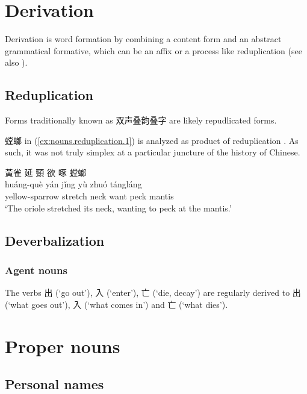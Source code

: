 \documentclass[UTF8, a4paper, oneside, scheme=plain, 12pt]{ctexrep}
\newcommand*{\citepage}[1]{p.~{#1}}
\newcommand{\translate}[1]{`#1'}
\begin{document}
\section{Derivation}

Derivation is word formation by combining a content form and an abstract grammatical formative,
which can be an affix or a process like reduplication (see also ).

\subsection{Reduplication}\label{sec:nouns.reduplication}

Forms traditionally known as 双声叠韵叠字 are likely repudlicated forms.

螳螂 in (\ref{ex:nouns.reduplication.1}) is analyzed as product of reduplication \citep[\citepage{93-95}]{sun2008reduplication}.
As such, it was not truly simplex at a particular juncture of the history of Chinese.

\begin{exe}
    \ex\label{ex:nouns.reduplication.1}
    \glll 黃雀 延 頸 欲 啄 螳螂 \\
    huáng-què yán jǐng yù zhuó tángláng \\
    yellow-sparrow stretch neck want peck mantis \\
    \glt\translate{The oriole stretched its neck, wanting to peck at the mantis.}
\end{exe}


\subsection{Deverbalization}

\subsubsection{Agent nouns}

The verbs 出 (\translate{go out}), 入 (\translate{enter}), 亡 (\translate{die, decay})
are regularly derived to 出 (\translate{what goes out}), 入 (\translate{what comes in})
and 亡 (\translate{what dies}).


\section{Proper nouns}

\subsection{Personal names}
\end{document}

